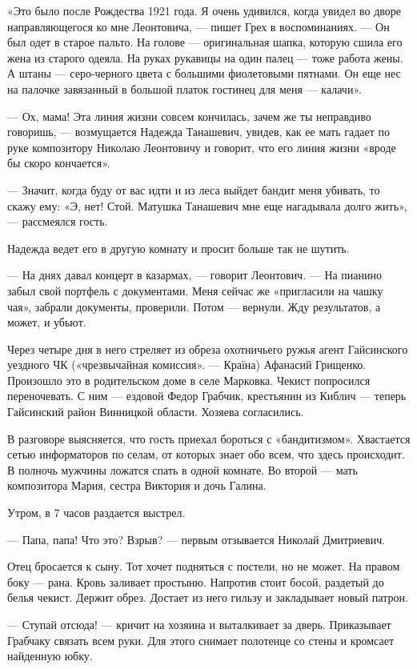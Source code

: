 «Это было после Рождества 1921 года. Я очень удивился, когда увидел во дворе
направляющегося ко мне Леонтовича, — пишет Грех в воспоминаниях. — Он был одет
в старое пальто. На голове — оригинальная шапка, которую сшила его жена из
старого одеяла. На руках рукавицы на один палец — тоже работа жены. А штаны —
серо-черного цвета с большими фиолетовыми пятнами. Он еще нес на палочке
завязанный в большой платок гостинец для меня — калачи».

— Ох, мама! Эта линия жизни совсем кончилась, зачем же ты неправдиво говоришь,
— возмущается Надежда Танашевич, увидев, как ее мать гадает по руке композитору
Николаю Леонтовичу и говорит, что его линия жизни «вроде бы скоро кончается».

— Значит, когда буду от вас идти и из леса выйдет бандит меня убивать, то скажу
ему: «Э, нет! Стой. Матушка Танашевич мне еще нагадывала долго жить», —
рассмеялся гость.

Надежда ведет его в другую комнату и просит больше так не шутить.

— На днях давал концерт в казармах, — говорит Леонтович. — На пианино забыл
свой портфель с документами. Меня сейчас же «пригласили на чашку чая», забрали
документы, проверили. Потом — вернули. Жду результатов, а может, и убьют.

Через четыре дня в него стреляет из обреза охотничьего ружья агент Гайсинского
уездного ЧК («чрезвычайная комиссия». — Країна) Афанасий Грищенко. Произошло
это в родительском доме в селе Марковка. Чекист попросился переночевать. С ним
— ездовой Федор Грабчик, крестьянин из Киблич — теперь Гайсинский район
Винницкой области. Хозяева согласились.

В разговоре выясняется, что гость приехал бороться с «бандитизмом». Хвастается
сетью информаторов по селам, от которых знает обо всем, что здесь происходит. В
полночь мужчины ложатся спать в одной комнате. Во второй — мать композитора
Мария, сестра Виктория и дочь Галина.

Утром, в 7 часов раздается выстрел.

— Папа, папа! Что это? Взрыв? — первым отзывается Николай Дмитриевич.

Отец бросается к сыну. Тот хочет подняться с постели, но не может. На правом
боку — рана. Кровь заливает простыню. Напротив стоит босой, раздетый до белья
чекист. Держит обрез. Достает из него гильзу и закладывает новый патрон.

— Ступай отсюда! — кричит на хозяина и выталкивает за дверь. Приказывает
Грабчаку связать всем руки. Для этого снимает полотенце со стены и кромсает
найденную юбку.

